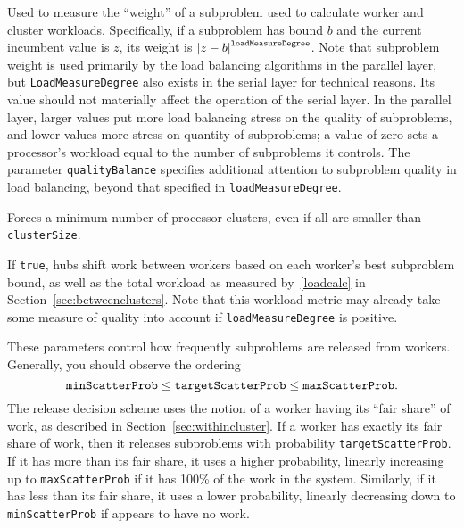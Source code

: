 Used to
measure the ``weight'' of a subproblem used to calculate worker and
cluster workloads.  Specifically, if a subproblem has bound $b$ and
the current incumbent value is $z$, its weight is ${\left|z -
b\right|}^{\text{\texttt{loadMeasureDegree}}}$.  Note that subproblem
weight is used primarily by the load balancing algorithms in the
parallel layer, but \texttt{LoadMeasureDegree} also exists in the serial
layer for technical reasons.  
Its value should not materially affect the operation of the serial
layer.  In the parallel layer, larger values put more load balancing
stress on the quality of subproblems, and lower values more stress on
quantity of subproblems; a value of zero sets a processor's workload
equal to the number of subproblems it controls.  The parameter
\texttt{qualityBalance} specifies additional attention to subproblem
quality in load balancing, beyond that specified in
\texttt{loadMeasureDegree}. 
 
Forces a minimum number of processor clusters, even if all are smaller than
\texttt{clusterSize}. 

If \texttt{true}, hubs shift work between workers based on each
worker's best subproblem bound,
as well as the total workload as measured by~\eqref{loadcalc} in
Section~\ref{sec:betweenclusters}.  Note that this workload metric
may already take some measure of quality into account if
\texttt{loadMeasureDegree} is positive.

\groupparams
{}
\groupparams
{}
These parameters control
how frequently subproblems are released from workers.  Generally, you
should observe the ordering
$$
\text{\texttt{minScatterProb}} \leq
\text{\texttt{targetScatterProb}} \leq
\text{\texttt{maxScatterProb}}.
$$ 
The release decision scheme uses the notion of a worker having its
``fair share'' of work, as described in
Section~\ref{sec:withincluster}.  If a
worker has exactly its fair share of work, then it releases subproblems with
probability \texttt{targetScatterProb}.  If it has more than its fair
share, it uses a higher probability, linearly increasing up to
\texttt{maxScatterProb} if it has 100\% of the work in the system.
Similarly, if it has less than its fair share, it uses a lower
probability, linearly decreasing down to \texttt{minScatterProb} if
appears to have no work.

